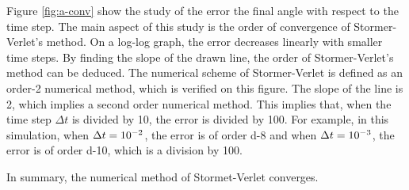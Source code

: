 \documentclass[a4paper,12pt,twoside]{article}
\begin{document}
Figure \ref{fig:a-conv} show the study of the error the final angle with respect to the time step.
The main aspect of this study is the order of convergence of Stormer-Verlet's method.
On a log-log graph, the error decreases linearly with smaller time steps.
By finding the slope of the drawn line, the order of Stormer-Verlet's method can be deduced.
The numerical scheme of Stormer-Verlet is defined as an order-2 numerical method, which is verified on this figure.
The slope of the line is 2, which implies a second order numerical method.
This implies that, when the time step $\Delta t$ is divided by \num{10}, the error is divided by \num{100}.
For example, in this simulation, when $\Delta t = \num{d-2}$, the error is of order \num{d-8} and when $\Delta t = \num{d-3}$, the error is of order \num{d-10}, which is a division by \num{100}.

In summary, the numerical method of Stormet-Verlet converges.
\end{document}
